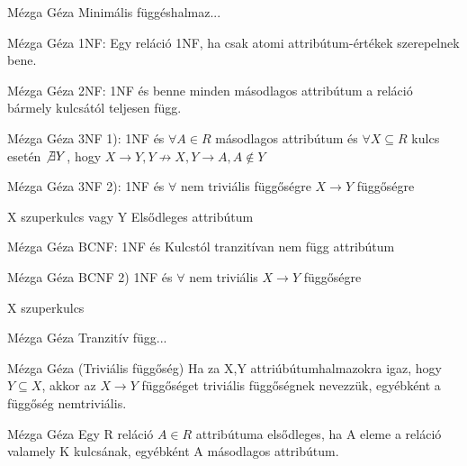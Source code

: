 \begin{definicio}{Mézga Géza}
Minimális függéshalmaz...
\end{definicio}

\begin{definicio}{Mézga Géza}
1NF: Egy reláció 1NF, ha csak atomi attribútum-értékek szerepelnek bene.
\end{definicio}

\begin{definicio}{Mézga Géza}
2NF: 1NF és benne minden másodlagos attribútum a reláció bármely kulcsától teljesen függ.
\end{definicio}

\begin{definicio}{Mézga Géza}
3NF 1): 1NF és $\forall A \in R$ másodlagos attribútum és $\forall X \subseteq R$ kulcs esetén $\not\exists Y$, hogy $ X\rightarrow Y, Y \nrightarrow X, Y\rightarrow A, A \not\in Y$
\end{definicio}

\begin{definicio}{Mézga Géza}
3NF 2): 1NF és $\forall$ nem triviális függőségre $X\rightarrow Y$ függőségre

X szuperkulcs vagy Y Elsődleges attribútum
\end{definicio}

\begin{definicio}{Mézga Géza}
BCNF: 1NF és Kulcstól tranzitívan nem függ attribútum
\end{definicio}

\begin{definicio}{Mézga Géza}
BCNF 2) 1NF és $\forall$ nem triviális $X\rightarrow Y$ függőségre

X szuperkulcs
\end{definicio}

\begin{definicio}{Mézga Géza}
Tranzitív függ...
\end{definicio}

\begin{definicio}{Mézga Géza}
(Triviális függőség) Ha za X,Y attriúbútumhalmazokra igaz, hogy $Y \subseteq X$, akkor az $X \rightarrow Y$ függőséget triviális függőségnek nevezzük, egyébként a függőség nemtriviális.
\end{definicio}

\begin{definicio}{Mézga Géza}
Egy R reláció $A \in R$ attribútuma elsődleges, ha A eleme a reláció valamely K kulcsának, egyébként A másodlagos attribútum.
\end{definicio}

